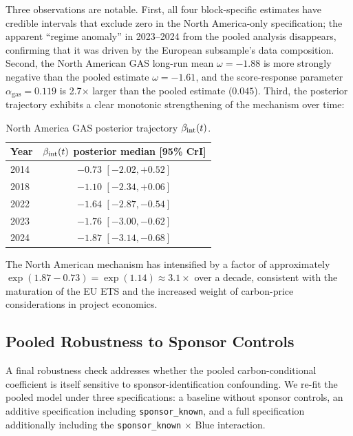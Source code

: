 Three observations are notable. First, all four block-specific estimates have credible intervals that exclude zero in the North America-only specification; the apparent ``regime anomaly'' in 2023--2024 from the pooled analysis disappears, confirming that it was driven by the European subsample's data composition. Second, the North American GAS long-run mean $\omega = -1.88$ is more strongly negative than the pooled estimate $\omega = -1.61$, and the score-response parameter $\alpha_{\mathrm{gas}} = 0.119$ is 2.7$\times$ larger than the pooled estimate ($0.045$). Third, the posterior trajectory exhibits a clear monotonic strengthening of the mechanism over time:

\begin{table}[h!]
\centering
\caption{North America GAS posterior trajectory $\beta_{\mathrm{int}}(t)$.}
\begin{tabular}{lc}
\toprule
Year & $\beta_{\mathrm{int}}(t)$ posterior median [95\% CrI] \\
\midrule
2014 & $-0.73$ $[-2.02, +0.52]$ \\
2018 & $-1.10$ $[-2.34, +0.06]$ \\
2022 & $-1.64$ $[-2.87, -0.54]$ \\
2023 & $-1.76$ $[-3.00, -0.62]$ \\
2024 & $\mathbf{-1.87}$ $[-3.14, -0.68]$ \\
\bottomrule
\end{tabular}
\label{tab:ch7-na-gas}
\end{table}

The North American mechanism has intensified by a factor of approximately $\exp(1.87 - 0.73) = \exp(1.14) \approx 3.1\times$ over a decade, consistent with the maturation of the EU ETS and the increased weight of carbon-price considerations in project economics.


\subsection{Pooled Robustness to Sponsor Controls}
\label{sec:ch7-pooled-sponsor}

A final robustness check addresses whether the pooled carbon-conditional coefficient is itself sensitive to sponsor-identification confounding. We re-fit the pooled model under three specifications: a baseline without sponsor controls, an additive specification including \texttt{sponsor\_known}, and a full specification additionally including the \texttt{sponsor\_known} $\times$ Blue interaction.

